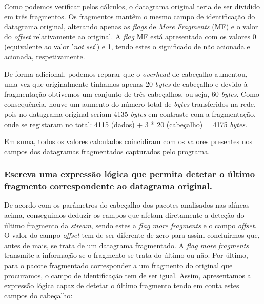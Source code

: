     \vspace{0.5cm}
    \par Como podemos verificar pelos cálculos, o datagrama original teria de ser dividido em três fragmentos. Os fragmentos mantêm o mesmo campo de identificação do datagrama original, alterando apenas as \textit{flags} de \textit{More Fragments} (MF) e o valor do \textit{offset} relativamente ao original. A \textit{flag} MF está apresentada com os valores 0 (equivalente ao valor '\textit{not set}') e 1, tendo estes o significado de não acionada e acionada, respetivamente.
    
    \par De forma adicional, podemos reparar que o \textit{overhead} de cabeçalho aumentou, uma vez que originalmente tínhamos apenas 20 \textit{bytes} de cabeçalho e devido à fragmentação obtivemos um conjunto de três cabeçalhos, ou seja, 60 \textit{bytes}.  
    Como consequência, houve um aumento do número total de \textit{bytes} transferidos na rede, pois no datagrama original seriam 4135 \textit{bytes} em contraste com a fragmentação, onde se registaram no total: 4115 (dados) + 3 * 20 (cabeçalho) = 4175 \textit{bytes}.
    
    \par Em suma, todos os valores calculados coincidiram com os valores presentes nos campos dos datagramas fragmentados capturados pelo programa.
    
    
\newpage
\subsubsection{Escreva uma expressão lógica que permita detetar o último fragmento correspondente ao datagrama original.}

    \par De acordo com os parâmetros do cabeçalho dos pacotes analisados nas alíneas acima, conseguimos deduzir os campos que afetam diretamente a deteção do último fragmento da \textit{stream}, sendo estes a \textit{flag more fragments} e o campo \textit{offset}. O valor do campo \textit{offset} tem de ser diferente de zero para assim concluirmos que, antes de mais, se trata de um datagrama fragmentado. A \textit{flag more fragments} transmite a informação se o fragmento se trata do último ou não. Por último, para o pacote fragmentado corresponder a um fragmento do original que procuramos, o campo de identificação tem de ser igual. Assim, apresentamos a expressão lógica capaz de detetar o último fragmento tendo em conta estes campos do cabeçalho:

